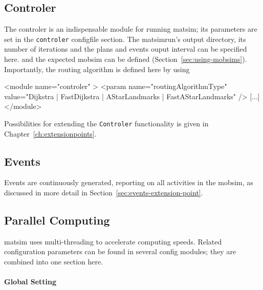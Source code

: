 \subsection{Controler}
\label{sec:using-controler}
The controler is an indispensable module for running \gls{matsim}; its parameters are set in the \lstinline|controler| \gls{configfile} section. The \gls{matsimrun}'s output directory, its number of iterations and the plans and events ouput interval can be specified here. and the expected \gls{mobsim} can be defined (Section~\ref{sec:using-mobsims}). Importantly, the routing algorithm is defined here by using
%
\begin{xml}
<module name="controler" >
    <param name="routingAlgorithmType" value="{Dijkstra | FastDijkstra |
    		AStarLandmarks | FastAStarLandmarks}" />
    [...]
</module>
\end{xml}
%
Possibilities for extending the \lstinline|Controler| functionality is given in %
Chapter~\ref{ch:extensionpoints}.

\subsection{Events}
\label{sec:using-events}

Events are continuously generated, reporting on all activities in the \gls{mobsim}, as discussed in more detail in Section~\ref{sec:events-extension-point}. 
% 

\subsection{Parallel Computing}
\label{sec:using-parallel-computing}

\gls{matsim} uses multi-threading to accelerate computing speeds.  Related configuration parameters can be found in several config modules; they are combined into one section here.

\paragraph{Global Setting}

